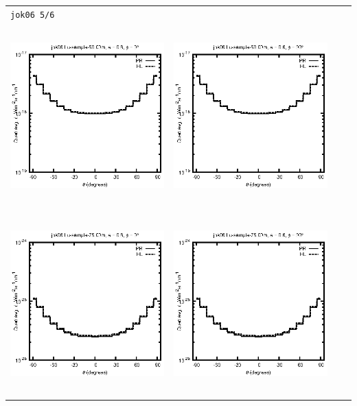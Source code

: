 \begin{tabular}{c c c c}
\multicolumn{4}{l}{\texttt{jok06 5/6}} \\
\includegraphics[height=7cm]{../eps/jok06_Lu_sample_50.00m_fwd.eps} &
\includegraphics[height=7cm]{../eps/jok06_Lu_sample_50.00m_cross.eps} \\
\includegraphics[height=7cm]{../eps/jok06_Lu_sample_75.00m_fwd.eps} &
\includegraphics[height=7cm]{../eps/jok06_Lu_sample_75.00m_cross.eps} \\

\end{tabular}
